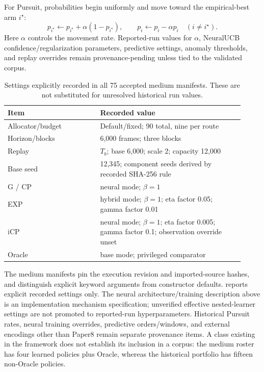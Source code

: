 For Pursuit, probabilities begin uniformly and move toward the empirical-best arm $i^\star$:
\[
p_{i^\star}\leftarrow p_{i^\star}+\alpha(1-p_{i^\star}),\qquad p_i\leftarrow p_i-\alpha p_i\quad(i\neq i^\star).
\]
Here $\alpha$ controls the movement rate. Reported-run values for $\alpha$, NeuralUCB confidence/regularization parameters, predictive settings, anomaly thresholds, and replay overrides remain provenance-pending unless tied to the validated corpus.

\begin{table}[t]
\centering\footnotesize
\caption{Settings explicitly recorded in all 75 accepted medium manifests. These are not substituted for unresolved historical run values.}
\label{tab:medium_recorded_settings}
\begin{tabular}{@{}p{0.36\linewidth}p{0.56\linewidth}@{}}
\toprule
Item & Recorded value\\
\midrule
Allocator/budget & Default/fixed; 90 total, nine per route\\
Horizon/blocks & 6,000 frames; three blocks\\
Replay & $T_b$; base 6,000; scale 2; capacity 12,000\\
Base seed & 12,345; component seeds derived by recorded SHA-256 rule\\
G / CP & neural mode; $\beta=1$\\
EXP & hybrid mode; $\beta=1$; eta factor 0.05; gamma factor 0.01\\
iCP & neural mode; $\beta=1$; eta factor 0.005; gamma factor 0.1; observation override unset\\
Oracle & base mode; privileged comparator\\
\bottomrule
\end{tabular}
\end{table}

The medium manifests pin the execution revision and imported-source hashes, and distinguish explicit keyword arguments from constructor defaults.  reports explicit recorded settings only. The neural architecture/training description above is an implementation mechanism specification; unverified effective nested-learner settings are not promoted to reported-run hyperparameters. Historical Pursuit rates, neural training overrides, predictive orders/windows, and external encodings other than Paper8 remain separate provenance items. A class existing in the framework does not establish its inclusion in a corpus: the medium roster has four learned policies plus Oracle, whereas the historical portfolio has fifteen non-Oracle policies.

